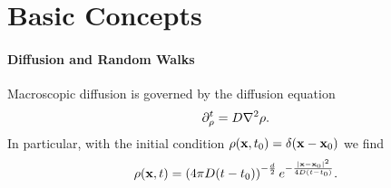 \section{Basic Concepts}

\paragraph{Diffusion and Random Walks}
Macroscopic diffusion is governed by the diffusion equation
\begin{align*}
	\del{t}{\rho} = D\laplacian{\rho}.
\end{align*}
In particular, with the initial condition $\rho(\vb{x}, t_{0}) = \delta(\vb{x} - \vb{x}_{0})$ we find
\begin{align*}
	\rho(\vb{x}, t) = \left(4\pi D(t - t_{0})\right)^{-\frac{d}{2}}e^{-\frac{\abs{\vb{x} - \vb{x}_{0}}^{2}}{4D(t - t_{0})}}.
\end{align*}

